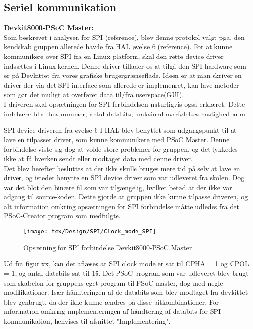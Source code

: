 \subsection{Seriel kommunikation}

\textbf{Devkit8000-PSoC Master:} \\

Som beskrevet i analysen for SPI (reference), blev denne protokol valgt pga. den kendskab gruppen allerede havde fra HAL øvelse 6 (reference). 
For at kunne kommunikere over SPI fra en Linux platform, skal den rette device driver indsættes i Linux kernen. Denne driver tillader os at tilgå
den SPI hardware som er på Devkittet fra vores grafiske brugergrænseflade. Ideen er at man skriver en driver der via det SPI interface som allerede er 
implemenret, kan lave metoder som gør det muligt at overfører data til/fra userspace(GUI).\\

I driveren skal opsætningen for SPI forbindelsen naturligvis også erklæret. Dette indebære bl.a. bus nummer, antal databits, maksimal overfølelses hastighed m.m.  
 
SPI device driveren fra øvelse 6 I HAL blev benyttet som udgangspunkt til at lave en tilpasset driver, som kunne kommunikere med PSoC Master. 
Denne forbindelse viste sig dog at volde store problemer for gruppen, og det lykkedes ikke at få hverken sendt eller modtaget data med denne driver.\\

Det blev herefter besluttes at der ikke skulle bruges mere tid på selv at lave en driver, og istedet benytte en SPI device driver som var udleveret fra skolen.
Dog var det blot den binære fil som var tilgængelig, hvilket betød at der ikke var adgang til source-koden. Dette gjorde at gruppen ikke kunne tilpasse driveren,
og alt information omkring opsætningen for SPI forbindelse måtte udledes fra det PSoC-Creator program som medfulgte. 

\begin{figure}[H]
\texttt{[image: tex/Design/SPI/Clock\_mode\_SPI]}
\caption{Opsætning for SPI forbindelse Devkit8000-PSoC Master}
\end{figure}

Ud fra figur xx, kan det aflæses at SPI clock mode er sat til CPHA = 1 og CPOL = 1, og antal databits sat til 16. Det PSoC program som var udleveret blev brugt
som skabelon for gruppens eget program til PSoC master, dog med nogle modifikationer. Især håndteringen af de databits som blev modtaget fra devkittet blev 
genbrugt, da der ikke kunne ændres på disse bitkombinationer. For information omkring implementeringen af håndtering af databits for SPI kommunikation, 
henvises til afsnittet "Implementering". \\

